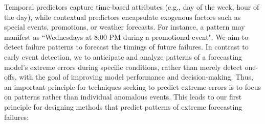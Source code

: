\documentclass[preprint,12pt]{elsarticle}
\begin{document}
Temporal predictors capture time-based attributes (e.g., day of the week, hour of the day), while contextual predictors encapsulate exogenous factors such as special events, promotions, or weather forecasts. For instance, a pattern may manifest as ``Wednesdays at 8:00 PM during a promotional event". We aim to detect failure patterns to forecast the timings of future failures. In contrast to early event detection, we  to anticipate and analyze patterns of a forecasting model’s extreme errors during specific conditions, rather than merely detect one-offs, with the goal of improving model performance and decision-making. Thus, an important principle for techniques seeking to predict extreme errors is to focus on patterns rather than individual anomalous events. This leads to our first principle for designing methods that predict patterns of extreme forecasting failures:

\renewcommand{\arraystretch}{1.3}
\end{document}
